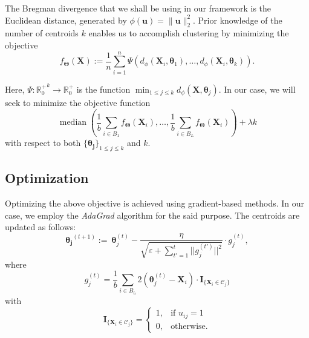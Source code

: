 \documentclass{article}
\newcommand{\bX}{\boldsymbol{X}}
\begin{document}
The Bregman divergence that we shall be using in our framework is the Euclidean distance, generated by $\phi(\boldsymbol{u})=\|\boldsymbol{u}\|_2^2$. Prior knowledge of the number of centroids $k$ enables us to accomplish clustering by minimizing the objective
\begin{equation}\label{ob}
    f_{\boldsymbol{\Theta}}(\boldsymbol{X}) := \frac{1}{n} \sum_{i=1}^n \Psi\left(d_\phi\left(\boldsymbol{X}_i, \boldsymbol{\theta}_1\right), \ldots, d_\phi\left(\boldsymbol{X}_i, \boldsymbol{\theta}_k\right)\right).
\end{equation}

Here, $\Psi: {\mathbb{R}^{+}_0}^k \rightarrow \mathbb{R}^{+}_0$ is the function $\min_{1\le j\le k} d_{\phi}(\bm{X},\bm{\theta}_j)$. In our case, we will seek to minimize the objective function
\begin{equation}\label{obj}
    \operatorname{median}\left(\frac{1}{b} \sum_{i \in B_1} f_{\boldsymbol{\Theta}}\left(\boldsymbol{X}_i\right), \ldots, \frac{1}{b} \sum_{i \in B_L} f_{\boldsymbol{\Theta}}\left(\boldsymbol{X}_i\right)\right) + \lambda k
\end{equation}
with respect to both $\{\bm{\theta_j}\}_{1\le j\le k}$ and $k$.


\subsection{Optimization}

Optimizing the above objective is achieved using gradient-based methods. In our case, we employ the \textit{AdaGrad} algorithm \cite{duchi2011adaptive} for the said purpose. The centroids are updated as follows:
\begin{equation}
    \boldsymbol{\theta_j}^{(t+1)} := ~\boldsymbol{\theta}_j^{(t)} - \dfrac{\eta}{\sqrt{\varepsilon + \sum_{t' = 1}^t ||g_j^{(t')}||^2}} \cdot g_j^{(t)},
\end{equation}
where 
\begin{equation}
    g_j^{(t)} = \frac{1}{b}\sum_{i \in B_{l_t}} 2(\boldsymbol{\theta}_j^{(t)} - \bX_i)\cdot \mathbf{I}_{\{\bX_i \in \mathcal{C}_j\}}
\end{equation}
with 
\begin{equation}
    \mathbf{I}_{\{\bX_i \in \mathcal{C}_j\}}=\begin{cases}
1, & \text{if $u_{ij} = 1$}\\
0, & \text{otherwise.}
\end{cases}
\end{equation}
\end{document}
